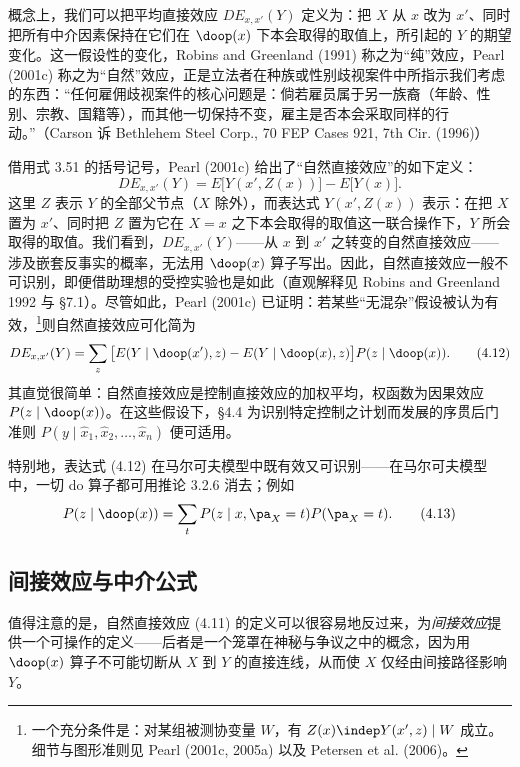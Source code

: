 概念上，我们可以把平均直接效应 $DE_{x,x'}(Y)$ 定义为：把 $X$ 从 $x$ 改为 $x'$、同时把所有中介因素保持在它们在 $\doop(x)$ 下本会取得的取值上，所引起的 $Y$ 的期望变化。这一假设性的变化，Robins and Greenland (1991) 称之为“纯”效应，Pearl (2001c) 称之为“自然”效应，正是立法者在种族或性别歧视案件中所指示我们考虑的东西：“任何雇佣歧视案件的核心问题是：倘若雇员属于另一族裔（年龄、性别、宗教、国籍等），而其他一切保持不变，雇主是否本会采取同样的行动。”（Carson 诉 Bethlehem Steel Corp., 70 FEP Cases 921, 7th Cir. (1996)）

借用式 3.51 的括号记号，Pearl (2001c) 给出了“自然直接效应”的如下定义：
\begin{equation}
DE_{x,x'}(Y)=E\big[Y(x',Z(x))\big]-E\big[Y(x)\big]. \tag{4.11}
\end{equation}
这里 $Z$ 表示 $Y$ 的全部父节点（$X$ 除外），而表达式 $Y(x',Z(x))$ 表示：在把 $X$ 置为 $x'$、同时把 $Z$ 置为它在 $X=x$ 之下本会取得的取值这一联合操作下，$Y$ 所会取得的取值。我们看到，$DE_{x,x'}(Y)$——从 $x$ 到 $x'$ 之转变的自然直接效应——涉及嵌套反事实的概率，无法用 $\doop(x)$ 算子写出。因此，自然直接效应一般不可识别，即便借助理想的受控实验也是如此（直观解释见 Robins and Greenland 1992 与 \S 7.1）。尽管如此，Pearl (2001c) 已证明：若某些“无混杂”假设被认为有效，\footnote{一个充分条件是：对某组被测协变量 $W$，有 $Z(x)\indep Y(x',z)\mid W$ 成立。细节与图形准则见 Pearl (2001c, 2005a) 以及 Petersen et al. (2006)。}则自然直接效应可化简为
\begin{equation}
DE_{x,x'}(Y)=\sum_z\big[E(Y\mid\doop(x'),z)-E(Y\mid\doop(x),z)\big]P(z\mid\doop(x)). \tag{4.12}
\end{equation}
其直觉很简单：自然直接效应是控制直接效应的加权平均，权函数为因果效应 $P(z\mid\doop(x))$。在这些假设下，\S 4.4 为识别特定控制之计划而发展的序贯后门准则 $P(y\mid\hat{x}_1,\hat{x}_2,\dots,\hat{x}_n)$ 便可适用。

特别地，表达式 \textup{(4.12)} 在马尔可夫模型中既有效又可识别——在马尔可夫模型中，一切 do 算子都可用推论 3.2.6 消去；例如
\begin{equation}
P(z\mid\doop(x))=\sum_t P(z\mid x,\pa_X=t)P(\pa_X=t). \tag{4.13}
\end{equation}

\subsection{间接效应与中介公式}

值得注意的是，自然直接效应 \textup{(4.11)} 的定义可以很容易地反过来，为\emph{间接效应}提供一个可操作的定义——后者是一个笼罩在神秘与争议之中的概念，因为用 $\doop(x)$ 算子不可能切断从 $X$ 到 $Y$ 的直接连线，从而使 $X$ 仅经由间接路径影响 $Y$。

